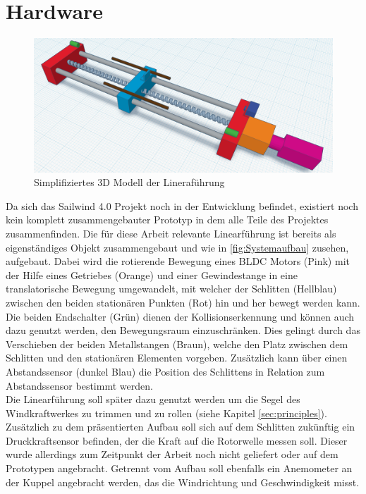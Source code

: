 \newpage
\section{Hardware}
\begin{figure}[H]
	\centering
	\includegraphics[width=1.0\textwidth]{images/Hardware/Linerarfuerhrung_3D_Modell.png}
	\caption{Simplifiziertes 3D Modell der Lineraführung}
	\label{fig:Systemaufbau}
\end{figure}
Da sich das Sailwind 4.0 Projekt noch in der Entwicklung befindet, existiert noch kein komplett zusammengebauter Prototyp in dem alle Teile des Projektes zusammenfinden. Die für diese Arbeit relevante Linearführung ist bereits als eigenständiges Objekt zusammengebaut und wie in \autoref{fig:Systemaufbau} zusehen, aufgebaut. Dabei wird die rotierende Bewegung eines BLDC Motors (Pink) mit der Hilfe eines Getriebes (Orange) und einer Gewindestange in eine translatorische Bewegung umgewandelt, mit welcher der Schlitten (Hellblau) zwischen den beiden stationären Punkten (Rot) hin und her bewegt werden kann. Die beiden Endschalter (Grün) dienen der Kollisionserkennung und können auch dazu genutzt werden, den Bewegungsraum einzuschränken. Dies gelingt durch das Verschieben der beiden Metallstangen (Braun), welche den Platz zwischen dem Schlitten und den stationären Elementen vorgeben. Zusätzlich kann über einen Abstandssensor (dunkel Blau) die Position des Schlittens in Relation zum Abstandssensor bestimmt werden.\\

\noindent Die Linearführung soll später dazu genutzt werden um die Segel des Windkraftwerkes zu trimmen und zu rollen (siehe Kapitel \ref{sec:principles}). Zusätzlich zu dem präsentierten Aufbau soll sich auf dem Schlitten zukünftig ein Druckkraftsensor befinden, der die Kraft auf die Rotorwelle messen soll. Dieser wurde allerdings zum Zeitpunkt der Arbeit noch nicht geliefert oder auf dem Prototypen angebracht. Getrennt vom Aufbau soll ebenfalls ein Anemometer an der Kuppel angebracht werden, das die Windrichtung und Geschwindigkeit misst.

